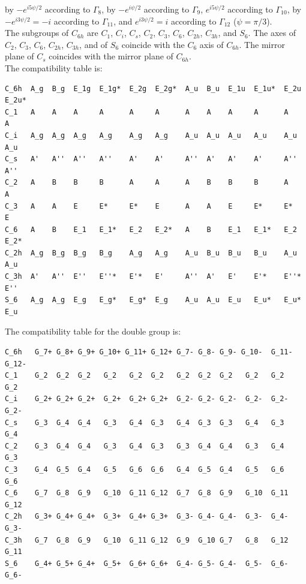 \documentclass[12pt,a4paper]{article}
\begin{document}
by $-e^{i5\psi/2}$ according to $\Gamma_8$, by $-e^{i\psi/2}$ according 
to $\Gamma_9$, $e^{i5\psi/2}$ according to $\Gamma_{10}$, by $-e^{i3\psi/2}=-i$ 
according to $\Gamma_{11}$, and $e^{i3\psi/2}=i$ according 
to $\Gamma_{12}$ ($\psi=\pi/3$). \\
The subgroups of $C_{6h}$ are $C_1$, $C_i$, $C_s$, $C_2$, $C_3$, $C_6$, 
$C_{2h}$, $C_{3h}$, and $S_6$. The axes of $C_2$, $C_3$, $C_6$, $C_{2h}$, 
$C_{3h}$, and of $S_6$ coincide with the $C_6$ axis of $C_{6h}$. The mirror 
plane of $C_s$ coincides with the mirror plane of $C_{6h}$.\\
The compatibility table is:
\begin{verbatim}
C_6h  A_g  B_g  E_1g  E_1g*  E_2g  E_2g*  A_u  B_u  E_1u  E_1u*  E_2u  E_2u*
C_1   A    A    A     A      A     A      A    A    A     A      A     A
C_i   A_g  A_g  A_g   A_g    A_g   A_g    A_u  A_u  A_u   A_u    A_u   A_u
C_s   A'   A''  A''   A''    A'    A'     A''  A'   A'    A'     A''   A''
C_2   A    B    B     B      A     A      A    B    B     B      A     A
C_3   A    A    E     E*     E*    E      A    A    E     E*     E*    E
C_6   A    B    E_1   E_1*   E_2   E_2*   A    B    E_1   E_1*   E_2   E_2*
C_2h  A_g  B_g  B_g   B_g    A_g   A_g    A_u  B_u  B_u   B_u    A_u   A_u
C_3h  A'   A''  E''   E''*   E'*   E'     A''  A'   E'    E'*    E''*  E'' 
S_6   A_g  A_g  E_g   E_g*   E_g*  E_g    A_u  A_u  E_u   E_u*   E_u*  E_u
\end{verbatim}
The compatibility table for the double group is:
\begin{verbatim}
C_6h   G_7+ G_8+ G_9+ G_10+ G_11+ G_12+ G_7- G_8- G_9- G_10-  G_11- G_12-
C_1    G_2  G_2  G_2   G_2   G_2  G_2   G_2  G_2  G_2   G_2   G_2   G_2
C_i    G_2+ G_2+ G_2+  G_2+  G_2+ G_2+  G_2- G_2- G_2-  G_2-  G_2-  G_2-  
C_s    G_3  G_4  G_4   G_3   G_4  G_3   G_4  G_3  G_3   G_4   G_3   G_4
C_2    G_3  G_4  G_4   G_3   G_4  G_3   G_3  G_4  G_4   G_3   G_4   G_3    
C_3    G_4  G_5  G_4   G_5   G_6  G_6   G_4  G_5  G_4   G_5   G_6   G_6  
C_6    G_7  G_8  G_9   G_10  G_11 G_12  G_7  G_8  G_9   G_10  G_11  G_12 
C_2h   G_3+ G_4+ G_4+  G_3+  G_4+ G_3+  G_3- G_4- G_4-  G_3-  G_4-  G_3-   
C_3h   G_7  G_8  G_9   G_10  G_11 G_12  G_9  G_10 G_7   G_8   G_12  G_11 
S_6    G_4+ G_5+ G_4+  G_5+  G_6+ G_6+  G_4- G_5- G_4-  G_5-  G_6-  G_6-
\end{verbatim}
\end{document}

